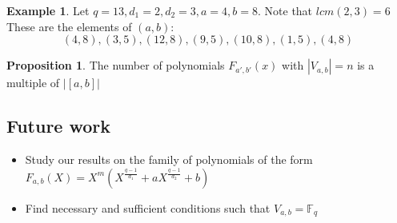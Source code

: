 \documentclass{article}
\theoremstyle{definition}
\newtheorem{example}[theorem]{Example}
\newtheorem{prop}[theorem]{Proposition}
\theoremstyle{remark}
\numberwithin{equation}{section}
\begin{document}
 \begin{example}
    Let $q = 13, d_1 = 2, d_2 = 3, a = 4, b = 8$. Note that $lcm(2,3) = 6$ These are the elements of $(a,b)$:
    $$ (4, 8), (3, 5), (12, 8), (9, 5), (10, 8), (1, 5), (4,8) $$
  \end{example}

\begin{prop}

  The number of polynomials $F_{a', b'}(x)$ with $|V_{a, b}| = n$ is a multiple of $|[a, b]|$

\end{prop}
    
\subsection{Future work}    

    \begin{itemize}
    \item Study our results on the family of polynomials of the form $F_{a,b}(X) = X^m(X^{\frac{q-1}{d_1}} + aX^{\frac{q-1}{d_2}} +b)$
    \item Find necessary and sufficient conditions such that $V_{a,b} = \mathbb{F}_q$
  \end{itemize}
 
  
\end{document}
